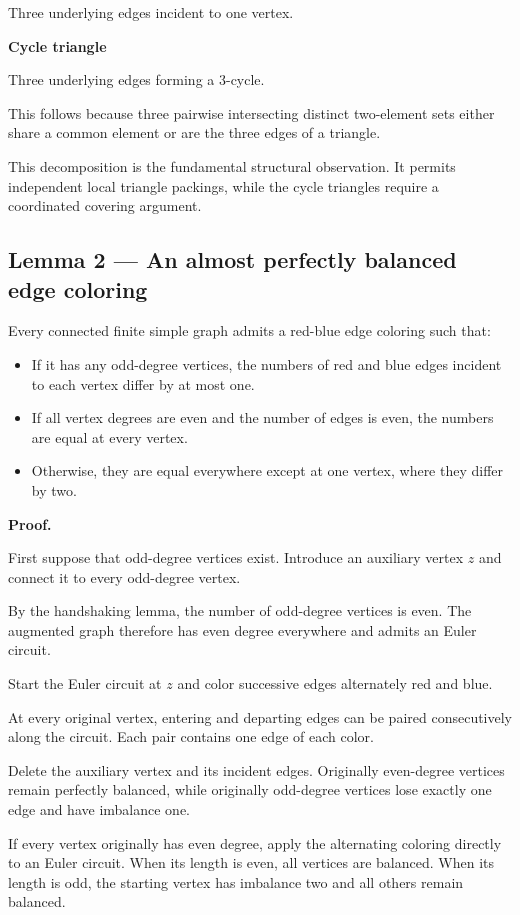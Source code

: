 \documentclass[11pt]{article}
\begin{document}
Three underlying edges incident to one vertex.

\textbf{Cycle triangle}

Three underlying edges forming a 3-cycle.

This follows because three pairwise intersecting distinct two-element sets either share a common element or are the three edges of a triangle.

This decomposition is the fundamental structural observation. It permits independent local triangle packings, while the cycle triangles require a coordinated covering argument.

\subsection{Lemma 2 --- An almost perfectly balanced edge coloring}

Every connected finite simple graph admits a red-blue edge coloring such that:

\begin{itemize}
\item If it has any odd-degree vertices, the numbers of red and blue edges incident to each vertex differ by at most one.
\item If all vertex degrees are even and the number of edges is even, the numbers are equal at every vertex.
\item Otherwise, they are equal everywhere except at one vertex, where they differ by two.

\end{itemize}
\textbf{Proof.}

First suppose that odd-degree vertices exist. Introduce an auxiliary vertex \(z\) and connect it to every odd-degree vertex.

By the handshaking lemma, the number of odd-degree vertices is even. The augmented graph therefore has even degree everywhere and admits an Euler circuit.

Start the Euler circuit at \(z\) and color successive edges alternately red and blue.

At every original vertex, entering and departing edges can be paired consecutively along the circuit. Each pair contains one edge of each color.

Delete the auxiliary vertex and its incident edges. Originally even-degree vertices remain perfectly balanced, while originally odd-degree vertices lose exactly one edge and have imbalance one.

If every vertex originally has even degree, apply the alternating coloring directly to an Euler circuit. When its length is even, all vertices are balanced. When its length is odd, the starting vertex has imbalance two and all others remain balanced.
\end{document}
